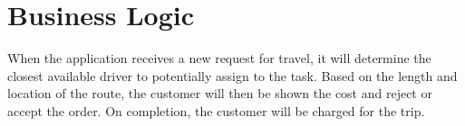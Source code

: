 \documentclass[10pt,twocolumn]{witseiepaper}
\begin{document}
\section{Business Logic}
When the application receives a new request for travel, it will determine the closest available driver to potentially assign to the task. Based on the length and location of the route, the customer will then be shown the cost and reject or accept the order. On completion, the customer will be charged for the trip.


%
%
%

\end{document}
